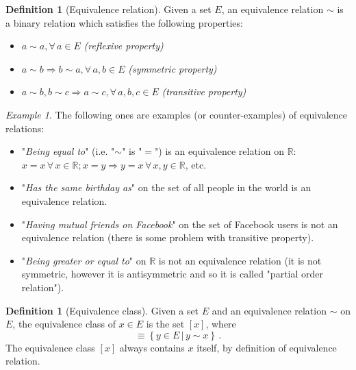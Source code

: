 \documentclass[a4paper,11pt,titlepage, article, oneside]{memoir}
\numberwithin{equation}{section}
\theoremstyle{definition}
\newtheorem{definition}[theorem]{Definition}
\theoremstyle{remark}
\newtheorem{example}[theorem]{Example}
\newcommand{\rfield}{\mathbb{R}}
\begin{document}
\begin{definition}[Equivalence relation]
  Given a set $E$, an equivalence relation $\sim$ is a binary relation which satisfies the following properties:
  \begin{itemize}
    \item $a \sim a, \forall\, a \in E$ \hspace*{\fill}\textit{(reflexive property)}
    \item $a \sim b \Rightarrow b \sim a, \forall\, a, b \in E$ \hspace*{\fill}\textit{(symmetric property)}
    \item $a \sim b, b \sim c \Rightarrow a \sim c, \forall \, a, b, c \in E$ \hspace*{\fill}\textit{(transitive property)}
  \end{itemize}
\end{definition}

\begin{tcolorbox}\begin{example}
  The following ones are examples (or counter-examples) of equivalence relations:
  \begin{itemize}
  \item "\textit{Being equal to}" (i.e. "$\sim$" is "$=$") is an equivalence relation on $\rfield$: $x=x \, \forall\, x \in \rfield; x=y \Rightarrow y=x \, \forall\, x, y \in \rfield$, etc.
  \item "\textit{Has the same birthday as}" on the set of all people in the world is an equivalence relation.
  \item "\textit{Having mutual friends on Facebook}" on the set of Facebook users is not an equivalence relation (there is some problem with transitive property).
  \item "\textit{Being greater or equal to}" on $\rfield$ is not an equivalence relation (it is not symmetric, however it is antisymmetric and so it is called "partial order relation").
\end{itemize}
\end{example}\end{tcolorbox}

\begin{definition}[Equivalence class]
  Given a set $E$ and an equivalence relation $\sim$ on $E$, the equivalence class of $x \in E$ is the set $[x]$, where
  \begin{equation}
    [x] \equiv \left \{ y \in E \,|\, y \sim x \right \} \, .
  \end{equation}
  The equivalence class $[x]$ always contains $x$ itself, by definition of equivalence relation.
\end{definition}
\end{document}
